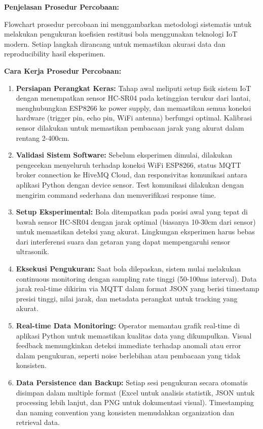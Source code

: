 \documentclass[a4paper,10pt]{article}
\begin{document}
\textbf{Penjelasan Prosedur Percobaan:}

Flowchart prosedur percobaan ini menggambarkan metodologi sistematis untuk melakukan pengukuran koefisien restitusi bola menggunakan teknologi IoT modern. Setiap langkah dirancang untuk memastikan akurasi data dan reproducibility hasil eksperimen.

\textbf{Cara Kerja Prosedur Percobaan:}
\begin{enumerate}
\item \textbf{Persiapan Perangkat Keras:} Tahap awal meliputi setup fisik sistem IoT dengan menempatkan sensor HC-SR04 pada ketinggian terukur dari lantai, menghubungkan ESP8266 ke power supply, dan memastikan semua koneksi hardware (trigger pin, echo pin, WiFi antenna) berfungsi optimal. Kalibrasi sensor dilakukan untuk memastikan pembacaan jarak yang akurat dalam rentang 2-400cm.

\item \textbf{Validasi Sistem Software:} Sebelum eksperimen dimulai, dilakukan pengecekan menyeluruh terhadap koneksi WiFi ESP8266, status MQTT broker connection ke HiveMQ Cloud, dan responsivitas komunikasi antara aplikasi Python dengan device sensor. Test komunikasi dilakukan dengan mengirim command sederhana dan memverifikasi response time.

\item \textbf{Setup Eksperimental:} Bola ditempatkan pada posisi awal yang tepat di bawah sensor HC-SR04 dengan jarak optimal (biasanya 10-30cm dari sensor) untuk memastikan deteksi yang akurat. Lingkungan eksperimen harus bebas dari interferensi suara dan getaran yang dapat mempengaruhi sensor ultrasonik.

\item \textbf{Eksekusi Pengukuran:} Saat bola dilepaskan, sistem mulai melakukan continuous monitoring dengan sampling rate tinggi (50-100ms interval). Data jarak real-time dikirim via MQTT dalam format JSON yang berisi timestamp presisi tinggi, nilai jarak, dan metadata perangkat untuk tracking yang akurat.

\item \textbf{Real-time Data Monitoring:} Operator memantau grafik real-time di aplikasi Python untuk memastikan kualitas data yang dikumpulkan. Visual feedback memungkinkan deteksi immediate terhadap anomali atau error dalam pengukuran, seperti noise berlebihan atau pembacaan yang tidak konsisten.

\item \textbf{Data Persistence dan Backup:} Setiap sesi pengukuran secara otomatis disimpan dalam multiple format (Excel untuk analisis statistik, JSON untuk processing lebih lanjut, dan PNG untuk dokumentasi visual). Timestamping dan naming convention yang konsisten memudahkan organization dan retrieval data.


\end{enumerate}
\end{document}
